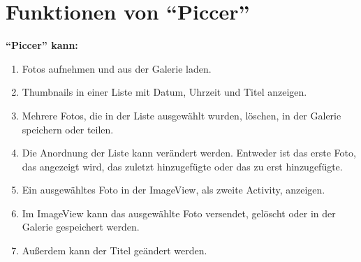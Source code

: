 \section{Funktionen von \enquote{Piccer}}
\textbf{\enquote{Piccer} kann:}
\begin{enumerate}
\item Fotos aufnehmen und aus der Galerie laden.
\item Thumbnails in einer Liste mit Datum, Uhrzeit und Titel anzeigen. 
\item Mehrere Fotos, die in der Liste ausgewählt wurden, löschen, in der Galerie speichern oder teilen.
\item Die Anordnung der Liste kann verändert werden. Entweder ist das erste Foto, das angezeigt wird, das zuletzt hinzugefügte oder das zu erst hinzugefügte.
\item Ein ausgewähltes Foto in der ImageView, als zweite Activity, anzeigen.
\item Im ImageView kann das ausgewählte Foto versendet, gelöscht oder in der Galerie gespeichert werden.
\item Außerdem kann der Titel geändert werden.

\end{enumerate}


